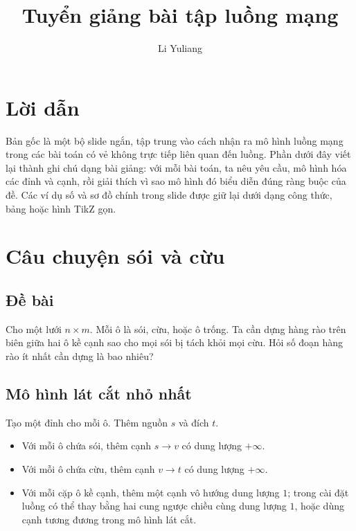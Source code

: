 \documentclass[11pt]{article}
\title{Tuyển giảng bài tập luồng mạng}
\author{Li Yuliang}
\date{}
\begin{document}
\maketitle


\section*{Lời dẫn}

Bản gốc là một bộ slide ngắn, tập trung vào cách nhận ra mô hình luồng mạng
trong các bài toán có vẻ không trực tiếp liên quan đến luồng. Phần dưới đây
viết lại thành ghi chú dạng bài giảng: với mỗi bài toán, ta nêu yêu cầu, mô
hình hóa các đỉnh và cạnh, rồi giải thích vì sao mô hình đó biểu diễn đúng
ràng buộc của đề. Các ví dụ số và sơ đồ chính trong slide được giữ lại dưới
dạng công thức, bảng hoặc hình TikZ gọn.

\section{Câu chuyện sói và cừu}

\subsection*{Đề bài}

Cho một lưới $n\times m$. Mỗi ô là sói, cừu, hoặc ô trống. Ta cần dựng hàng
rào trên biên giữa hai ô kề cạnh sao cho mọi sói bị tách khỏi mọi cừu. Hỏi số
đoạn hàng rào ít nhất cần dựng là bao nhiêu?

\subsection*{Mô hình lát cắt nhỏ nhất}

Tạo một đỉnh cho mỗi ô. Thêm nguồn $s$ và đích $t$.

\begin{itemize}
  \item Với mỗi ô chứa sói, thêm cạnh $s\to v$ có dung lượng $+\infty$.
  \item Với mỗi ô chứa cừu, thêm cạnh $v\to t$ có dung lượng $+\infty$.
  \item Với mỗi cặp ô kề cạnh, thêm một cạnh vô hướng dung lượng $1$; trong
  cài đặt luồng có thể thay bằng hai cung ngược chiều cùng dung lượng $1$,
  hoặc dùng cạnh tương đương trong mô hình lát cắt.
\end{itemize}
\end{document}
